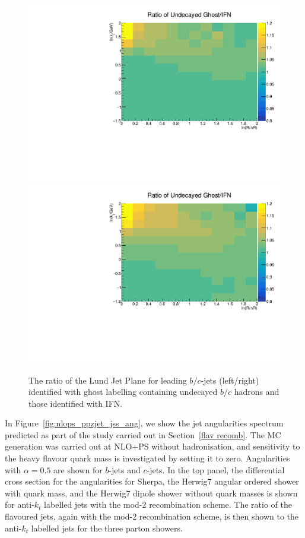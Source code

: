 \documentclass[10pt,a4paper]{book}
\begin{document}
\begin{figure}
    \centering
    \includegraphics[scale=0.49]{ftag/lpr_b_ghost_undecayed.pdf} 
    \includegraphics[scale=0.49]{ftag/lpr_c_ghost_undecayed.pdf}
    \caption{The ratio of the Lund Jet Plane for leading $b/c$-jets (left/right) identified with ghost labelling containing undecayed $b/c$ hadrons and those identified with IFN.}
    \label{GHOST-IFN lp}
\end{figure}

In Figure~\ref{fig:nlops_ppzjet_jss_ang}, we show the jet angularities spectrum predicted as part of the study carried out in Section~\ref{flav recomb}. The MC generation was carried out at NLO+PS without hadronisation, and sensitivity to the heavy flavour quark mass is investigated by setting it to zero. Angularities with $\alpha = 0.5$ are shown for $b$-jets and $c$-jets. In the top panel, the differential cross section for the angularities for Sherpa, the Herwig7 angular ordered shower with quark mass, and the Herwig7 dipole shower without quark masses is shown for anti-$k_t$ labelled jets with the mod-2 recombination scheme. The ratio of the flavoured jets, again with the mod-2 recombination scheme, is then shown to the anti-$k_t$ labelled jets for the three parton showers. 
\end{document}
